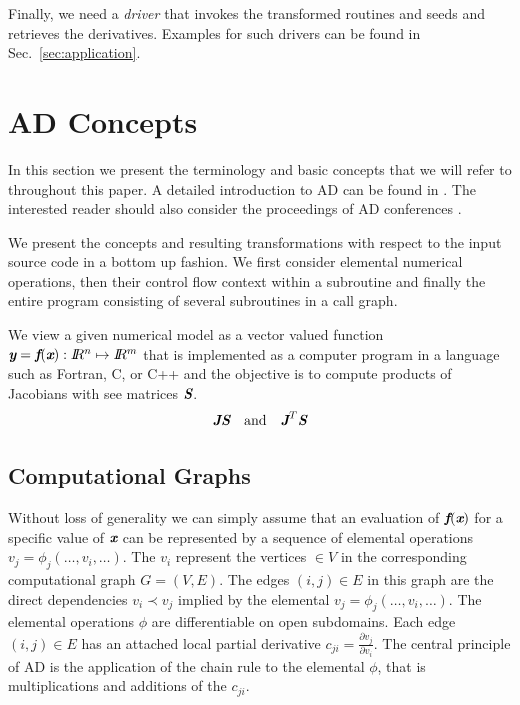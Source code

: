 \documentclass{book}
\newcommand{\R}{I\!\!R}
\newcommand{\bmf}{\mbox{\bf\em f}}
\newcommand{\bmJ}{\mbox{\bf\em J}}
\newcommand{\bmS}{\mbox{\bf\em S}}
\newcommand{\bmx}{\mbox{\bf\em x}}
\newcommand{\bmy}{\mbox{\bf\em y}}
\newcommand{\refsec}[1]{{Sec.~\ref{#1}}}
\begin{document}
Finally, we need a {\em driver} that invokes the transformed routines and seeds and retrieves the derivatives.
Examples for such drivers can be found in \refsec{sec:application}.

\chapter{AD Concepts}\label{sec:ADIntro}

In this section we present the terminology and basic concepts that 
we will refer to throughout this paper. 
A detailed introduction to AD can be found in \cite{Griewank2008EDP}.
The interested reader should also consider the proceedings of AD 
conferences \cite{Griewank1991ADo,Berz1996CDT,Corliss2002ADo,Bucker2005ADA,Bischof2008AiA}.

We present the concepts and resulting transformations 
with respect to the input source code 
in a bottom up fashion.  
We first consider elemental numerical operations, 
then their control flow context within a subroutine and finally the entire program 
consisting of several subroutines in a call graph. 

We view a given numerical model as a 
vector valued function $\bmy=\bmf(\bmx): \R^n\mapsto \R^m$ that is implemented 
as a computer program in a language such as Fortran, C, or C++ and the objective is to  
compute products of Jacobians with see matrices $\bmS$.
\begin{equation}\label{eqn:JacVecProds}
\bmJ \bmS \quad \mbox{and} \quad \bmJ^T \bmS
\end{equation}
\section{Computational Graphs} \label{sec:computationalGraphs}

Without loss of generality we can simply assume that an evaluation of $\bmf(\bmx)$ for  
a specific value of $\bmx$ can be represented by a sequence of 
elemental operations $v_j=\phi_j(\ldots,v_i,\ldots)$. 
The $v_i$ represent the vertices $\in V$ in the corresponding computational 
graph $G=(V,E)$. The edges $(i,j)\in E$ in this graph are the direct dependencies 
$v_i\prec v_j$ implied by the elemental $v_j=\phi_j(\ldots,v_i,\ldots)$.
The elemental operations $\phi$ are differentiable on open subdomains. 
Each edge $(i,j)\in E$ has an attached local partial derivative 
$c_{ji}=\frac{\partial v_j}{\partial v_i}$. 
The central principle of AD is 
the application of the chain rule to the elemental $\phi$, that is 
multiplications and additions of the  $c_{ji}$.  
\end{document}
